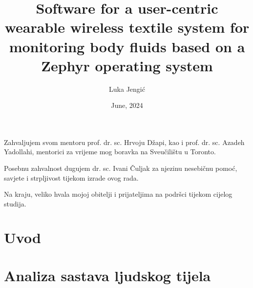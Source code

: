 \documentclass[diplomskirad, numeric, utf8, times]{fer}
\title{Software for a user-centric wearable wireless textile system for monitoring body fluids based on a Zephyr operating system}
\author{Luka Jengić}
\date{June, 2024}
\begin{document}
\maketitle






\begin{zahvale}

Zahvaljujem svom mentoru prof. dr. sc. Hrvoju Džapi, kao i prof. dr. sc. Azadeh Yadollahi, mentorici za vrijeme mog boravka na Sveučilištu u Toronto.

Posebnu zahvalnost dugujem dr. sc. Ivani Čuljak za njezinu nesebičnu pomoć, savjete i strpljivost tijekom izrade ovog rada.

Na kraju, veliko hvala mojoj obitelji i prijateljima na podršci tijekom cijelog studija.
\end{zahvale}


\mainmatter


\tableofcontents


\chapter{Uvod}
\label{pog:uvod}



\chapter{Analiza sastava ljudskog tijela}
\label{pog:glavni_dio}



\end{document}
